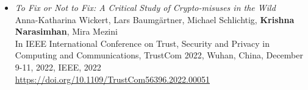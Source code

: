 \begin{itemize}
\begin{itemize}
\item \emph{To Fix or Not to Fix: A Critical Study of Crypto-misuses in the Wild} \\
Anna-Katharina Wickert, Lars Baumgärtner, Michael Schlichtig, \textbf{Krishna Narasimhan}, Mira Mezini \\
In IEEE International Conference on Trust, Security and Privacy in Computing and Communications, TrustCom 2022, Wuhan, China, December 9-11, 2022, IEEE, 2022 \\
\url{https://doi.org/10.1109/TrustCom56396.2022.00051}
\end{itemize}

\end{itemize}